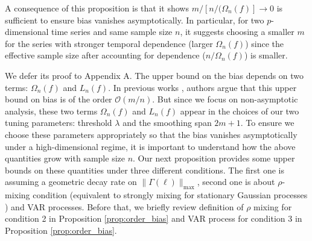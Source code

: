 A consequence of this proposition is that it shows $m/[n /(\Omega_n(f)] \rightarrow 0$ is sufficient to ensure bias vanishes asymptotically. In particular, for two $p$-dimensional time series and same sample size $n$, it suggests choosing a smaller $m$ for the series with stronger temporal dependence (larger $\Omega_n(f)$) since the effective sample size after accounting for dependence ($n/\Omega_n(f)$) is smaller.

We defer its proof to Appendix A. The upper bound on the bias depends on two terms: $\Omega_n(f)$ and $L_n(f)$. In previous works \cite{bohm2009shrinkage, bohm2008structural}, authors  argue that this upper bound on bias is of the order $\mathcal{O}(m/n)$. But since we focus on non-asymptotic analysis, these two terms $\Omega_n(f)$ and $L_n(f)$ appear in the choices of our two tuning parameters: threshold $\lambda$ and the smoothing span $2m+1$. To ensure we choose these parameters appropriately so that the bias vanishes asymptotically under a high-dimensional regime, it is important to understand how the above quantities grow with sample size $n$. Our next proposition provides some upper bounds on these quantities under  three different conditions. The first one is assuming a geometric decay rate on $\|\Gamma(\ell)\|_{\max}$, second one is 
about $\rho$-mixing condition (equivalent to strongly mixing for stationary Gaussian processes  \citep{bradley2005basic}) and VAR processes. Before that, we briefly review definition of $\rho$ mixing for condition 2 in Proposition \ref{prop:order_bias} and VAR process for condition 3 in Proposition \ref{prop:order_bias}. 

